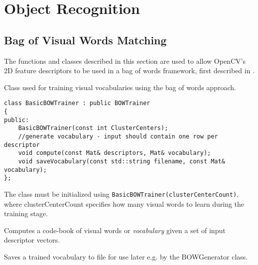 \section{Object Recognition}

\subsection{Bag of Visual Words Matching}

The functions and classes described in this section are used to allow OpenCV's 2D feature descriptors to be used in a bag of words framework, first described in \cite{sivic_zisserman_2003}.

Class used for training visual vocabularies using the bag of words approach.

\begin{lstlisting}
class BasicBOWTrainer : public BOWTrainer
{
public:
    BasicBOWTrainer(const int ClusterCenters);
    //generate vocabulary - input should contain one row per descriptor
    void compute(const Mat& descriptors, Mat& vocabulary);
    void saveVocabulary(const std::string filename, const Mat& vocabulary);
};
\end{lstlisting}

The class must be initialized using \texttt{BasicBOWTrainer(clusterCenterCount)}, where clusterCenterCount specifies how many visual words to learn during the training stage.

Computes a code-book of visual words or \emph{vocabulary} given a set of input descriptor vectors.

\begin{description}
\end{description}

Saves a trained vocabulary to file for use later e.g. by the BOWGenerator class.

\begin{description}
\end{description}

